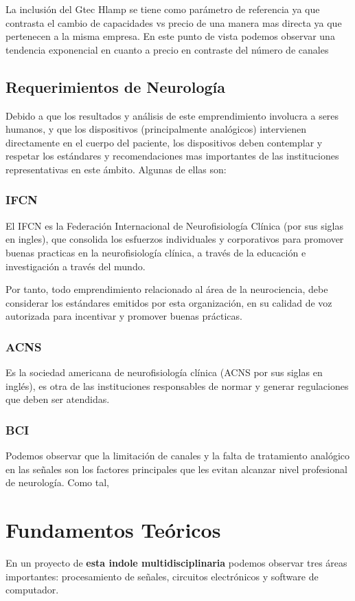 La inclusión del Gtec Hlamp se tiene como parámetro de referencia ya que contrasta el cambio de capacidades vs precio de una manera mas directa ya que pertenecen a la misma empresa. En este punto de vista podemos observar una tendencia exponencial en cuanto a precio en contraste del número de canales

\subsection{Requerimientos de Neurología}
\label{sec:org4b60baa}
Debido a que los resultados y análisis de este emprendimiento involucra a seres humanos, y que los dispositivos (principalmente analógicos) intervienen directamente en el cuerpo del paciente, los dispositivos deben contemplar y respetar los estándares y recomendaciones mas importantes de las instituciones representativas en este ámbito. Algunas de ellas son:

\subsubsection{IFCN}
\label{sec:org65ad908}
El IFCN es la Federación Internacional de Neurofisiología Clínica (por sus siglas en ingles), que consolida los esfuerzos individuales y corporativos para promover buenas practicas en la neurofisiología clínica, a través de la educación e investigación a través del mundo.

Por tanto, todo emprendimiento relacionado al área de la neurociencia, debe considerar los estándares emitidos por esta organización, en su calidad de voz autorizada para incentivar y promover buenas prácticas.

\subsubsection{ACNS}
\label{sec:orgde80fde}
Es la sociedad americana de neurofisiología clínica (ACNS por sus siglas en inglés), es otra de las instituciones responsables de normar y generar regulaciones que deben ser atendidas.
\subsubsection{BCI}
\label{sec:org4bc143d}
Podemos observar que la limitación de canales y la falta de tratamiento analógico en las señales son los factores principales que les evitan alcanzar nivel profesional de neurología. Como tal,

\section{Fundamentos Teóricos}
\label{sec:orgdcc212d}
En un proyecto de \textbf{esta indole multidisciplinaria} podemos observar tres áreas importantes: procesamiento de señales, circuitos electrónicos y software de computador.

